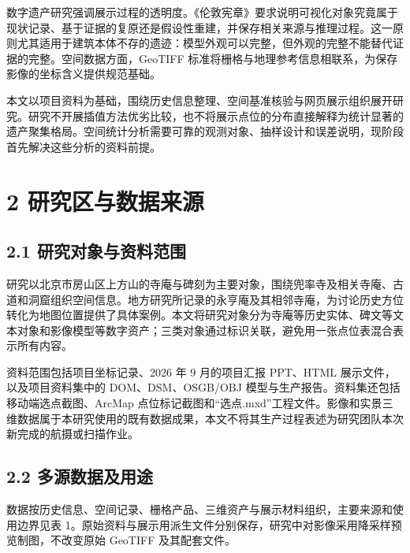 \documentclass[UTF8,a4paper,zihao=-4]{ctexart}
\begin{document}
数字遗产研究强调展示过程的透明度。《伦敦宪章》要求说明可视化对象究竟属于现状记录、基于证据的复原还是假设性重建，并保存相关来源与推理过程\cite{r5}。这一原则尤其适用于建筑本体不存的遗迹：模型外观可以完整，但外观的完整不能替代证据的完整。空间数据方面，GeoTIFF 标准将栅格与地理参考信息相联系，为保存影像的坐标含义提供规范基础\cite{r6}。


本文以项目资料为基础，围绕历史信息整理、空间基准核验与网页展示组织展开研究。研究不开展插值方法优劣比较，也不将展示点位的分布直接解释为统计显著的遗产聚集格局。空间统计分析需要可靠的观测对象、抽样设计和误差说明，现阶段首先解决这些分析的资料前提。


\section*{2 研究区与数据来源}

\subsection*{2.1 研究对象与资料范围}

研究以北京市房山区上方山的寺庵与碑刻为主要对象，围绕兜率寺及相关寺庵、古道和洞窟组织空间信息。地方研究所记录的永亨庵及其相邻寺庵，为讨论历史方位转化为地图位置提供了具体案例\cite{r3}。本文将研究对象分为寺庵等历史实体、碑文等文本对象和影像模型等数字资产；三类对象通过标识关联，避免用一张点位表混合表示所有内容。


资料范围包括项目坐标记录、2026 年 9 月的项目汇报 PPT、HTML 展示文件，以及项目资料集中的 DOM、DSM、OSGB/OBJ 模型与生产报告。资料集还包括移动端选点截图、ArcMap 点位标记截图和“选点.mxd”工程文件。影像和实景三维数据属于本研究使用的既有数据成果，本文不将其生产过程表述为研究团队本次新完成的航摄或扫描作业。


\subsection*{2.2 多源数据及用途}

数据按历史信息、空间记录、栅格产品、三维资产与展示材料组织，主要来源和使用边界见表 1。原始资料与展示用派生文件分别保存，研究中对影像采用降采样预览制图，不改变原始 GeoTIFF 及其配套文件。
\end{document}
